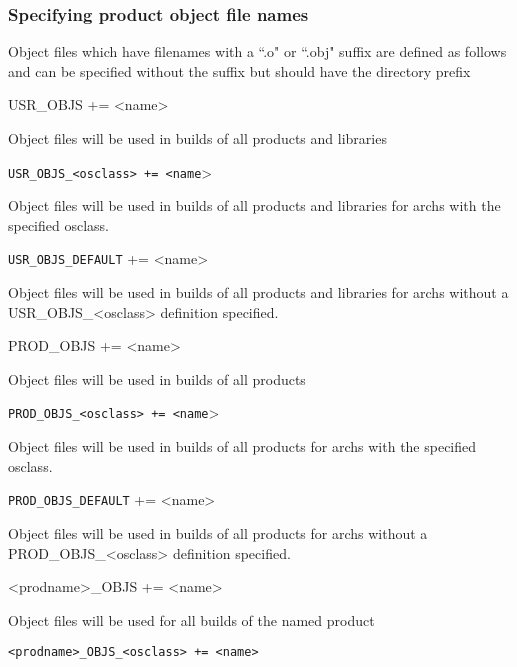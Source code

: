 \subsubsection{Specifying product object file names}

Object files which have filenames with a ``.o" or ``.obj" suffix are defined as follows and can be specified without the 
suffix but should have the directory prefix 

\begin{description}

\item {}USR\_OBJS += \textless{}name\textgreater{}

Object files will be used in builds of all products and libraries

\item \verb|USR_OBJS_<osclass> += <name|\textgreater{}

Object files will be used in builds of all products and libraries for archs with the specified osclass.

\item \verb|USR_OBJS_DEFAULT| += \textless{}name\textgreater{}

Object files will be used in builds of all products and libraries for archs without a USR\_OBJS\_\textless{}osclass\textgreater{} 
definition specified.

\item {}PROD\_OBJS += \textless{}name\textgreater{}

Object files will be used in builds of all products

\item \verb|PROD_OBJS_<osclass> += <name|\textgreater{}

Object files will be used in builds of all products for archs with the specified osclass.

\item \verb|PROD_OBJS_DEFAULT| += \textless{}name\textgreater{}

Object files will be used in builds of all products for archs without a PROD\_OBJS\_\textless{}osclass\textgreater{} definition 
specified.

\item \textless{}prodname\textgreater{}\_OBJS += \textless{}name\textgreater{}

Object files will be used for all builds of the named product

\item \verb|<prodname>_OBJS_<osclass> += <name>| 


\end{description}
